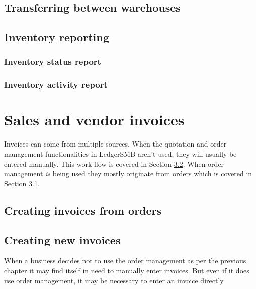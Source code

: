\section{Transferring between warehouses}

\section{Inventory reporting}

\subsection{Inventory status report}

\subsection{Inventory activity report}




\chapter{Sales and vendor invoices}
\label{cha:Invoicing}

Invoices can come from multiple sources. When the quotation and order
management functionalities in LedgerSMB aren't used, they will usually
be entered manually. This work flow is covered in Section
\ref{sec:ManuallyCreatingInvoices}.
When order management \emph{is} being used they mostly originate from orders
which is covered in Section \ref{sec:InvoicesFromOrders}.



\section{Creating invoices from orders}
\label{sec:InvoicesFromOrders}





\section{Creating new invoices}
\label{sec:ManuallyCreatingInvoices}



When a business decides not to use the order management as per the previous
chapter it may find itself in need to manually enter invoices. But even
if it does use order management, it may be necessary to enter an invoice
directly.

